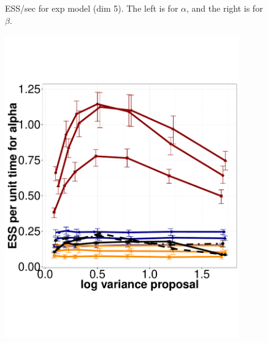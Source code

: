 \begin{figure}
\begin{minipage}[hp]{0.45\linewidth}
    \vspace{-0 in}
  \end{minipage}
    \caption{ESS/sec for exp model (dim 5). The left is for $\alpha$, and the right is for $\beta$.}
     \label{fig:ESS_EXP_D5}
  \end{figure}

  \begin{figure}%
  \centering
  \begin{minipage}[!hp]{0.45\linewidth}
  \centering
    \includegraphics [width=0.90\textwidth, angle=0]{figs/exp_10_alpha.pdf}
      \end{minipage}
  \begin{minipage}[hp]{0.45\linewidth}
  \centering

\end{minipage}
\end{figure}
